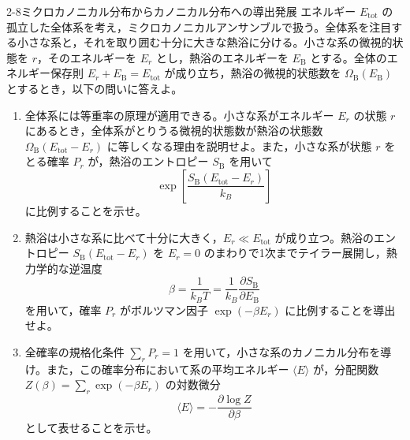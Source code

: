 
\begin{mondai}{2-8}{ミクロカノニカル分布からカノニカル分布への導出}{発展}
エネルギー $E_{\mathrm{tot}}$ の孤立した全体系を考え，ミクロカノニカルアンサンブルで扱う。全体系を注目する小さな系と，それを取り囲む十分に大きな熱浴に分ける。小さな系の微視的状態を $r$，そのエネルギーを $E_r$ とし，熱浴のエネルギーを $E_{\mathrm{B}}$ とする。全体のエネルギー保存則 $E_r + E_{\mathrm{B}} = E_{\mathrm{tot}}$ が成り立ち，熱浴の微視的状態数を $\Omega_{\mathrm{B}}(E_{\mathrm{B}})$ とするとき，以下の問いに答えよ。

\begin{enumerate}
  \item 全体系には等重率の原理が適用できる。小さな系がエネルギー $E_r$ の状態 $r$ にあるとき，全体系がとりうる微視的状態数が熱浴の状態数 $\Omega_{\mathrm{B}}(E_{\mathrm{tot}} - E_r)$ に等しくなる理由を説明せよ。また，小さな系が状態 $r$ をとる確率 $P_r$ が，熱浴のエントロピー $S_{\mathrm{B}}$ を用いて
  \begin{equation*}
  \exp\left[ \frac{S_{\mathrm{B}}(E_{\mathrm{tot}} - E_r)}{k_B} \right]
  \end{equation*}
  に比例することを示せ。

  \item 熱浴は小さな系に比べて十分に大きく，$E_r \ll E_{\mathrm{tot}}$ が成り立つ。熱浴のエントロピー $S_{\mathrm{B}}(E_{\mathrm{tot}} - E_r)$ を $E_r = 0$ のまわりで1次までテイラー展開し，熱力学的な逆温度
  \begin{equation*}
  \beta = \frac{1}{k_B T} = \frac{1}{k_B} \frac{\partial S_{\mathrm{B}}}{\partial E_{\mathrm{B}}}
  \end{equation*}
  を用いて，確率 $P_r$ がボルツマン因子 $\exp(-\beta E_r)$ に比例することを導出せよ。

  \item 全確率の規格化条件 $\sum_r P_r = 1$ を用いて，小さな系のカノニカル分布を導け。また，この確率分布において系の平均エネルギー $\langle E \rangle$ が，分配関数 $Z(\beta) = \sum_r \exp(-\beta E_r)$ の対数微分
  \begin{equation*}
  \langle E \rangle = -\frac{\partial \log Z}{\partial \beta}
  \end{equation*}
  として表せることを示せ。
\end{enumerate}
\end{mondai}

